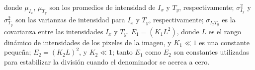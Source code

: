 donde $\mu_{I_x}$, $\mu_{T_y}$ son los promedios de intensidad de $I_x$ y $T_y$, respectivamente; $\sigma^2_{I_x}$ y $\sigma^2_{T_y}$ son las varianzas de intensidad para $I_x$ y $T_y$, respectivamente; $\sigma_{I_xT_y}$ es la covarianza entre las intensidades $I_x$ y $T_y$. $E_1=(K_1L^2)$, donde $L$ es el rango dinámico de intensidades de los pixeles de la imagen, y $K_1 \ll 1$ es una constante pequeña; $E_2=(K_2L)^2$, y $K_2 \ll 1$; tanto $E_1$ como $E_2$ son constantes utilizadas para estabilizar la división cuando el denominador se acerca a cero.







